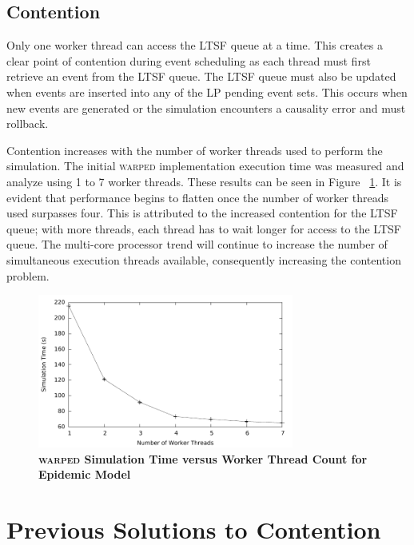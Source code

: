 \documentclass[11pt]{book}
\begin{document}
\subsection{Contention}

Only one worker thread can access the LTSF queue at a time.  This creates a clear point of
contention during event scheduling as each thread must first retrieve an event from the
LTSF queue.  The LTSF queue must also be updated when events are inserted into any of the
LP pending event sets.  This occurs when new events are generated or the simulation
encounters a causality error and must rollback.

Contention increases with the number of worker threads used to perform the
simulation.  The initial \textsc{warped} implementation execution time was
measured and analyze using 1 to 7 worker threads.  These results can be seen in
Figure ~\ref{fig:notsx_profile}.  It is evident that performance begins to
flatten once the number of worker threads used surpasses four.  This is
attributed to the increased contention for the LTSF queue; with more threads,
each thread has to wait longer for access to the LTSF queue.  The multi-core
processor trend will continue to increase the number of simultaneous execution
threads available, consequently increasing the contention problem.

\begin{figure}[H]
    \centering
    \graphicspath{ {./figures/} }
    \includegraphics[width=0.75\textwidth,keepaspectratio]{notsx_profile}
    \caption{\textbf{\textsc{warped} Simulation Time versus Worker Thread Count for
        Epidemic Model}}\label{fig:notsx_profile}
\end{figure}

\section{Previous Solutions to Contention}
\end{document}

